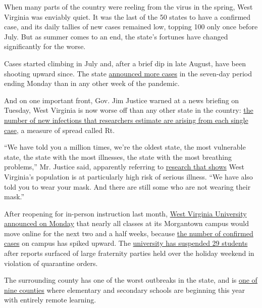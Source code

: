 When many parts of the country were reeling from the virus in the
spring, West Virginia was enviably quiet. It was the last of the 50
states to have a confirmed case, and its daily tallies of new cases
remained low, topping 100 only once before July. But as summer comes to
an end, the state's fortunes have changed significantly for the worse.

Cases started climbing in July and, after a brief dip in late August,
have been shooting upward since. The state
\href{https://www.nytimes3xbfgragh.onion/interactive/2020/us/west-virginia-coronavirus-cases.html}{announced
more cases} in the seven-day period ending Monday than in any other week
of the pandemic.

And on one important front, Gov. Jim Justice warned at a news briefing
on Tuesday, West Virginia is now worse off than any other state in the
country:
\href{https://slack-redir.net/link?url=https\%3A\%2F\%2Fwww.nytimes3xbfgragh.onion\%2F2020\%2F04\%2F23\%2Fworld\%2Feurope\%2Fcoronavirus-R0-explainer.html\&v=3}{the
number of new infections that researchers estimate are arising from each
single case}, a measure of spread called Rt.

``We have told you a million times, we're the oldest state, the most
vulnerable state, the state with the most illnesses, the state with the
most breathing problems,'' Mr. Justice said, apparently referring to
\href{https://www.kff.org/global-health-policy/issue-brief/how-many-adults-are-at-risk-of-serious-illness-if-infected-with-coronavirus/}{research
that shows} West Virginia's population is at particularly high risk of
serious illness. ``We have also told you to wear your mask. And there
are still some who are not wearing their mask.''

After reopening for in-person instruction last month,
\href{https://www.wvu.edu/return-to-campus/announcements/class-delivery-update-september-7}{West
Virginia University announced on Monday} that nearly all classes at its
Morgantown campus would move online for the next two and a half weeks,
because
\href{https://www.wvu.edu/return-to-campus/daily-test-results/morgantown\#weekly-campus-testing}{the
number of confirmed cases} on campus has spiked upward. The
\href{https://wvutoday.wvu.edu/stories/2020/09/06/wvu-suspends-29-students-for-covid-19-related-violations-additional-sanctions-pending}{university
has suspended 29 students} after reports surfaced of large fraternity
parties held over the holiday weekend in violation of quarantine
orders.~

The surrounding county has one of the worst outbreaks in the state, and
is \href{https://wvde.us/school-reentry-metrics-protocols/}{one of nine
counties} where elementary and secondary schools are beginning this year
with entirely remote learning.

